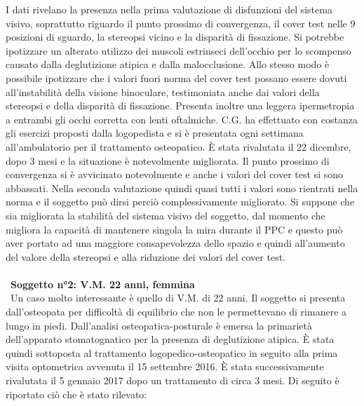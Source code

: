 I dati rivelano la presenza nella prima valutazione di disfunzioni del sistema visivo, soprattutto riguardo il punto prossimo di convergenza, il cover test nelle 9 posizioni di sguardo, la stereopsi vicino e la disparità di fissazione. Si potrebbe ipotizzare un alterato utilizzo dei muscoli estrinseci dell’occhio per lo scompenso causato dalla deglutizione atipica e dalla malocclusione. Allo stesso modo è possibile ipotizzare che i valori fuori norma del cover test possano essere dovuti all’instabilità della visione binoculare, testimoniata anche dai valori della stereopsi e della disparità di fissazione. Presenta inoltre una leggera ipermetropia a entrambi gli occhi corretta con lenti oftalmiche. 
C.G. ha effettuato con costanza gli esercizi proposti dalla logopedista e si è presentata ogni settimana all’ambulatorio per il trattamento osteopatico. È stata rivalutata il 22 dicembre, dopo 3 mesi e la situazione è notevolmente migliorata. Il punto prossimo di convergenza si è avvicinato notevolmente e anche i valori del cover test si sono abbassati. Nella seconda valutazione quindi quasi tutti i valori sono rientrati nella norma e il soggetto può dirsi perciò complessivamente migliorato.
Si suppone che sia migliorata la stabilità del sistema visivo del soggetto, dal momento che migliora la capacità di mantenere singola la mira durante il PPC e questo può aver portato ad una maggiore consapevolezza dello spazio e quindi all’aumento del valore della stereopsi e alla riduzione dei valori del cover test. 
\\\ \\\
\textbf{Soggetto n°2: V.M. 22 anni, femmina}
\\\
Un caso molto interessante è quello di V.M. di 22 anni. Il soggetto si presenta dall’osteopata per difficoltà di equilibrio che non le permettevano di rimanere a lungo in piedi. Dall’analisi osteopatica-posturale è emersa la primarietà dell’apparato stomatognatico per la presenza di deglutizione atipica. È stata quindi sottoposta al trattamento logopedico-osteopatico in seguito alla prima visita optometrica avvenuta il 15 settembre 2016. È stata successivamente rivalutata il 5 gennaio 2017 dopo un trattamento di circa 3 mesi. Di seguito è riportato ciò che è stato rilevato:


